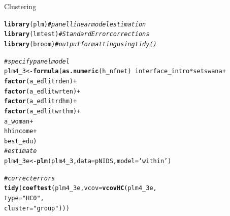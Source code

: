 \documentclass[a4paper,british]{article}\usepackage[]{graphicx}\usepackage[]{color}
\makeatletter
\newcommand{\hlstr}[1]{\textcolor[rgb]{0.192,0.494,0.8}{#1}}%
\newcommand{\hlcom}[1]{\textcolor[rgb]{0.678,0.584,0.686}{\textit{#1}}}%
\newcommand{\hlopt}[1]{\textcolor[rgb]{0,0,0}{#1}}%
\newcommand{\hlstd}[1]{\textcolor[rgb]{0.345,0.345,0.345}{#1}}%
\newcommand{\hlkwb}[1]{\textcolor[rgb]{0.69,0.353,0.396}{#1}}%
\newcommand{\hlkwc}[1]{\textcolor[rgb]{0.333,0.667,0.333}{#1}}%
\newcommand{\hlkwd}[1]{\textcolor[rgb]{0.737,0.353,0.396}{\textbf{#1}}}%
\newenvironment{kframe}{%
 \def\at@end@of@kframe{}%
 \ifinner\ifhmode%
  \def\at@end@of@kframe{\end{minipage}}%
  \begin{minipage}{\columnwidth}%
 \fi\fi%
 \def\FrameCommand##1{\hskip\@totalleftmargin \hskip-\fboxsep
 \colorbox{shadecolor}{##1}\hskip-\fboxsep
     \hskip-\linewidth \hskip-\@totalleftmargin \hskip\columnwidth}%
 \MakeFramed {\advance\hsize-\width
   \@totalleftmargin\z@ \linewidth\hsize
   \@setminipage}}%
 {\par\unskip\endMakeFramed%
 \at@end@of@kframe}
\newenvironment{knitrout}{}{} %
\makeatother
\begin{document}
\begin{table}[H]
\caption{Clustering}

\begin{knitrout}
\color{fgcolor}\begin{kframe}
\begin{alltt}
\hlkwd{library}\hlstd{(plm)}    \hlcom{# panel linear model estimation}
\hlkwd{library}\hlstd{(lmtest)} \hlcom{# Standard Error corrections}
\hlkwd{library}\hlstd{(broom)}  \hlcom{# output formatting using tidy()}

\hlcom{# specify panel model}
\hlstd{plm4_3} \hlkwb{<-} \hlkwd{formula}\hlstd{(}\hlkwd{as.numeric}\hlstd{(h_nfnet)}  \hlopt{~} \hlstd{interface_intro}\hlopt{*}\hlstd{setswana}  \hlopt{+}
                                         \hlkwd{factor}\hlstd{(a_edlitrden)}  \hlopt{+}
                                         \hlkwd{factor}\hlstd{(a_edlitwrten)} \hlopt{+}
                                         \hlkwd{factor}\hlstd{(a_edlitrdhm)}  \hlopt{+}
                                         \hlkwd{factor}\hlstd{(a_edlitwrthm)} \hlopt{+}
                                         \hlstd{a_woman}              \hlopt{+}
                                         \hlstd{hhincome}             \hlopt{+}
                                         \hlstd{best_edu              )}
\hlcom{# estimate}
\hlstd{plm4_3e} \hlkwb{<-} \hlkwd{plm}\hlstd{(plm4_3,} \hlkwc{data}\hlstd{=pNIDS,} \hlkwc{model}\hlstd{=}\hlstr{'within'}\hlstd{)}
\end{alltt}


{\ttfamily\noindent\bfseries{}}\begin{alltt}
\hlcom{# correct errors}
\hlkwd{tidy}\hlstd{(} \hlkwd{coeftest}\hlstd{(plm4_3e,} \hlkwc{vcov}\hlstd{=}\hlkwd{vcovHC}\hlstd{(plm4_3e,}
                                    \hlkwc{type}\hlstd{=}\hlstr{"HC0"}\hlstd{,}
                                    \hlkwc{cluster}\hlstd{=}\hlstr{"group"}\hlstd{)) )}
\end{alltt}


{\ttfamily\noindent\bfseries{}}\end{kframe}
\end{knitrout}
\end{table}
\end{document}
